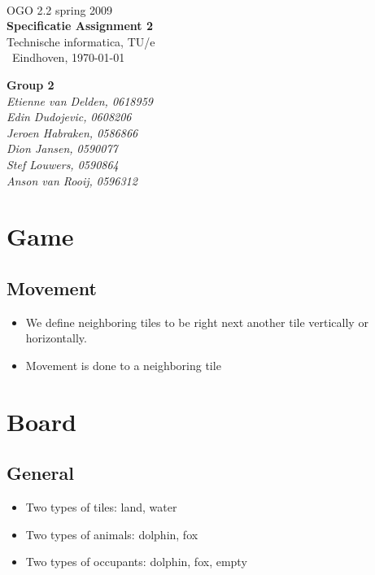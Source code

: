 \documentclass[a4paper,twoside,11pt]{article}
\begin{document}
   \begin{titlepage}
        {\ }\\[5.0cm]
        { {\Large OGO 2.2 spring 2009}}\\[0.2cm]
        {\bf \Huge Specificatie Assignment 2 }\\[0.1cm]
        { {\Large {Technische informatica, TU/e} }}\\[1.0cm]
        {\ Eindhoven, \today }\\[0.2cm]
        \begin{flushright}
            {\bf {\small Group 2 }}\\[0.0cm]
            {\em {\small Etienne van Delden, 0618959}}\\
            {\em {\small Edin Dudojevic, 0608206}}\\
            {\em {\small Jeroen Habraken, 0586866}}\\
            {\em {\small Dion Jansen, 0590077 }}\\
            {\em {\small Stef Louwers, 0590864}}\\
            {\em {\small Anson van Rooij, 0596312}}\\[0.5cm]
        \end{flushright}
    \end{titlepage}
\newpage
    \setcounter{tocdepth}{2}

    \tableofcontents
\newpage

\section{Game} %
\label{sec:game}
  \subsection{Movement} %
  \label{sub:movement}
    \begin{itemize}
      \item We define neighboring tiles to be right next another tile vertically or horizontally.
      \item Movement is done to a neighboring tile
    \end{itemize}

\section{Board}
  \subsection{General}
    \begin{itemize}
        \item Two types of tiles: land, water
        \item Two types of animals: dolphin, fox
        \item Two types of occupants: dolphin, fox, empty
    \end{itemize}
\end{document}
